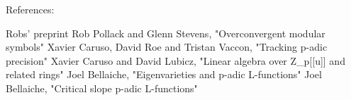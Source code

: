 References:

Robs' preprint
Rob Pollack and Glenn Stevens, "Overconvergent modular symbols"
Xavier Caruso, David Roe and Tristan Vaccon, "Tracking p-adic precision"
Xavier Caruso and David Lubicz, "Linear algebra over Z_p[[u]] and related rings"
Joel Bellaiche, "Eigenvarieties and p-adic L-functions"
Joel Bellaiche, "Critical slope p-adic L-functions"
